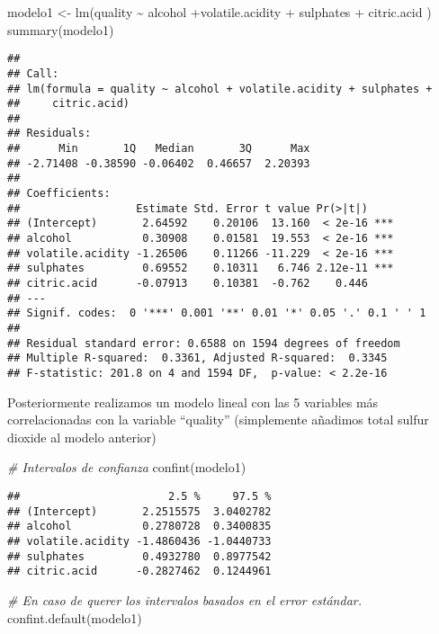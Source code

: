 \documentclass[
]{article}
\newenvironment{Shaded}{\begin{snugshade}}{\end{snugshade}}
\newcommand{\CommentTok}[1]{\textcolor[rgb]{0.56,0.35,0.01}{\textit{#1}}}
\newcommand{\FunctionTok}[1]{\textcolor[rgb]{0.00,0.00,0.00}{#1}}
\newcommand{\NormalTok}[1]{#1}
\newcommand{\OtherTok}[1]{\textcolor[rgb]{0.56,0.35,0.01}{#1}}
\newcommand{\SpecialCharTok}[1]{\textcolor[rgb]{0.00,0.00,0.00}{#1}}
\begin{document}
\begin{Shaded}
\begin{Highlighting}[]
\NormalTok{modelo1 }\OtherTok{\textless{}{-}} \FunctionTok{lm}\NormalTok{(quality }\SpecialCharTok{\textasciitilde{}}\NormalTok{ alcohol }\SpecialCharTok{+}\NormalTok{volatile.acidity }\SpecialCharTok{+}\NormalTok{ sulphates }\SpecialCharTok{+}\NormalTok{ citric.acid )}
\FunctionTok{summary}\NormalTok{(modelo1)}
\end{Highlighting}
\end{Shaded}

\begin{verbatim}
## 
## Call:
## lm(formula = quality ~ alcohol + volatile.acidity + sulphates + 
##     citric.acid)
## 
## Residuals:
##      Min       1Q   Median       3Q      Max 
## -2.71408 -0.38590 -0.06402  0.46657  2.20393 
## 
## Coefficients:
##                  Estimate Std. Error t value Pr(>|t|)    
## (Intercept)       2.64592    0.20106  13.160  < 2e-16 ***
## alcohol           0.30908    0.01581  19.553  < 2e-16 ***
## volatile.acidity -1.26506    0.11266 -11.229  < 2e-16 ***
## sulphates         0.69552    0.10311   6.746 2.12e-11 ***
## citric.acid      -0.07913    0.10381  -0.762    0.446    
## ---
## Signif. codes:  0 '***' 0.001 '**' 0.01 '*' 0.05 '.' 0.1 ' ' 1
## 
## Residual standard error: 0.6588 on 1594 degrees of freedom
## Multiple R-squared:  0.3361, Adjusted R-squared:  0.3345 
## F-statistic: 201.8 on 4 and 1594 DF,  p-value: < 2.2e-16
\end{verbatim}

Posteriormente realizamos un modelo lineal con las 5 variables más
correlacionadas con la variable ``quality'' (simplemente añadimos total
sulfur dioxide al modelo anterior)

\begin{Shaded}
\begin{Highlighting}[]
\CommentTok{\# Intervalos de confianza}
\FunctionTok{confint}\NormalTok{(modelo1)}
\end{Highlighting}
\end{Shaded}

\begin{verbatim}
##                       2.5 %     97.5 %
## (Intercept)       2.2515575  3.0402782
## alcohol           0.2780728  0.3400835
## volatile.acidity -1.4860436 -1.0440733
## sulphates         0.4932780  0.8977542
## citric.acid      -0.2827462  0.1244961
\end{verbatim}

\begin{Shaded}
\begin{Highlighting}[]
\CommentTok{\# En caso de querer los intervalos basados en el error estándar.}
\FunctionTok{confint.default}\NormalTok{(modelo1)}
\end{Highlighting}
\end{Shaded}
\end{document}
